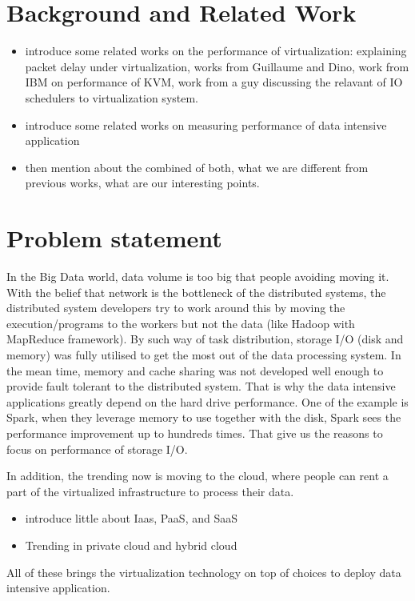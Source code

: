 \documentclass{acmsig}
\begin{document}

\section{Background and Related Work}
\begin{itemize}
  \item introduce some related works on the performance of virtualization: explaining packet delay under virtualization, works from Guillaume and Dino, work from IBM on performance of KVM, work from a guy discussing the relavant of IO schedulers to virtualization system.
  \item introduce some related works on measuring performance of data intensive application
 \item then mention about the combined of both, what we are different from previous works, what are our interesting points.
\end{itemize}
\section{Problem statement}

In the Big Data world, data volume is too big that people avoiding moving it. With the belief that network is the bottleneck of the distributed systems, the distributed system developers try to work around this by moving the execution/programs to the workers but not the data (like Hadoop with MapReduce framework). By such way of task distribution, storage I/O (disk and memory) was fully utilised to get the most out of the data processing system. In the mean time, memory and cache sharing was not developed well enough to provide fault tolerant to the distributed system. That is why the data intensive applications greatly depend on the hard drive performance. One of the example is Spark, when they leverage memory to use together with the disk, Spark sees the performance improvement up to hundreds times. That give us the reasons to focus on performance of storage I/O.

In addition, the trending now is moving to the cloud, where people can rent a part of the virtualized infrastructure to process their data.
\begin{itemize}
 \item introduce little about Iaas, PaaS, and SaaS
 \item Trending in private cloud and hybrid cloud
\end{itemize}
All of these brings the virtualization technology on top of choices to deploy data intensive application.
\end{document}
